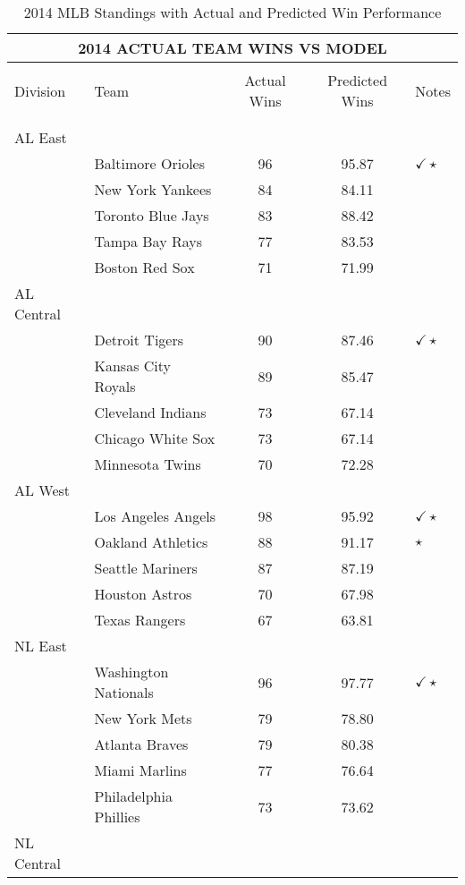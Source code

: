 \documentclass{article} %
\begin{document}
\begin{table}[h!]
\caption{2014 MLB Standings with Actual and Predicted Win Performance}
\label{table1}
\begin{center}
\begin{tabular}{llccl}
\multicolumn{5}{c}{\bf 2014 ACTUAL TEAM WINS VS MODEL}
\\ \hline \\
Division & Team & Actual Wins & Predicted Wins & Notes \\
\\ \hline \\
AL East &  &  &  &  \\
& Baltimore Orioles & 96 & 95.87 &$\checkmark 	\star $ \\
& New York Yankees & 84 & 84.11 & \\
& Toronto Blue Jays & 83 & 88.42 & \\
& Tampa Bay Rays & 77 & 83.53 & \\
& Boston Red Sox & 71 & 71.99 & \\
AL Central & & & & \\
& Detroit Tigers & 90 & 87.46 & $\checkmark 	\star $ \\
& Kansas City Royals & 89 & 85.47 & \\
& Cleveland Indians & 73 & 67.14 & \\
& Chicago White Sox & 73 & 67.14 & \\
& Minnesota Twins & 70 & 72.28 & \\
AL West & & & & \\
& Los Angeles Angels & 98 & 95.92 & $\checkmark 	\star $ \\
& Oakland Athletics & 88 & 91.17 & $\star$ \\
& Seattle Mariners & 87 & 87.19 &  \\
& Houston Astros & 70 & 67.98 & \\
& Texas Rangers & 67 & 63.81 & \\
NL East & & & & \\
& Washington Nationals & 96 & 97.77 & $\checkmark 	\star $ \\
& New York Mets & 79 & 78.80 & \\
& Atlanta Braves & 79 & 80.38 & \\
& Miami Marlins & 77 & 76.64 & \\
& Philadelphia Phillies & 73 & 73.62 & \\
NL Central & & & & \\

\end{tabular}
\end{center}
\end{table}
\end{document}
